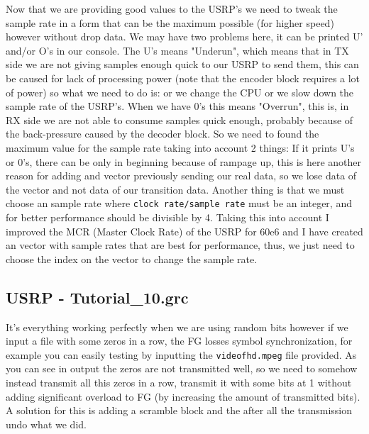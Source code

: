 \documentclass[a4paper, 10pt, conference]{ieeeconf}      %
\begin{document}
    Now that we are providing good values to the USRP's we need to tweak the sample rate in a form that can be the maximum possible (for higher speed) however without drop data. We may have two problems here, it can be printed U' and/or O's in our console. The U's means "Underun", which means that in TX side we are not giving samples enough quick to our USRP to send them, this can be caused for lack of processing power (note that the encoder block requires a lot of power) so what we need to do is: or we change the CPU or we slow down the sample rate of the USRP's. When we have 0's this means "Overrun", this is, in RX side we are not able to consume samples quick enough, probably because of the back-pressure caused by the decoder block. So we need to found the maximum value for the sample rate taking into account 2 things: If it prints U's or 0's, there can be only in beginning because of rampage up, this is here another reason for adding and vector previously sending our real data, so we lose data of the vector and not data of our transition data. Another thing is that we must choose an sample rate where \verb|clock rate/sample rate| must be an integer, and for better performance should be divisible by 4.
    Taking this into account I improved the MCR (Master Clock Rate) of the USRP for 60e6 and I have created an vector with sample rates that are best for performance, thus, we just need to choose the index on the vector to change the sample rate.


\subsection{USRP - Tutorial\_10.grc}
    It's everything working perfectly when we are using random bits however if we input a file with some zeros in a row, the FG losses symbol synchronization, for example you can easily testing by inputting the \verb|videofhd.mpeg| file provided. As you can see in output the zeros are not transmitted well, so we need to somehow instead transmit all this zeros in a row, transmit it with some bits at 1 without adding significant overload to FG (by increasing the amount of transmitted bits). A solution for this is adding a scramble block and the after all the transmission undo what we did.
    
\end{document}
